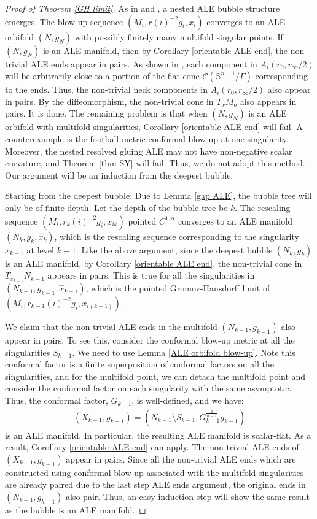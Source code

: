 \documentclass[12pt]{amsart}
\theoremstyle{definition}
\begin{document}
\begin{proof}[Proof of Theorem \ref{GH limit}]
    As in \cite{Bubble} and \cite{TV2}, a nested ALE bubble structure emerges. The blow-up sequence $(M_i, r(i)^{-2}g_i, x_i)$ converges to an ALE orbifold $(N,g_N)$ with possibly finitely many multifold singular points. If $(N,g_N)$ is an ALE manifold, then by Corollary \ref{orientable ALE end}, the non-trivial ALE ends appear in pairs. As shown in \cite{Bubble}, each component in $A_i(r_0, r_\infty/2)$ will be arbitrarily close to a portion of the flat cone $ \mathcal{C}(\mathbb{S}^{n-1}/\Gamma)$ corresponding to the ends. Thus, the non-trivial neck components in $A_i(r_0, r_\infty/2)$ also appear in pairs. By the diffeomorphism, the non-trivial cone in $T_xM_o$ also appears in pairs. It is done. The remaining problem is that when $(N,g_N)$ is an ALE orbifold with multifold singularities, Corollary \ref{orientable ALE end} will fail. A counterexample is the football metric conformal blow-up at one singularity. Moreover, the nested resolved gluing ALE may not have non-negative scalar curvature, and Theorem \ref{thm SY} will fail. Thus, we do not adopt this method. Our argument will be an induction from the deepest bubble.

    Starting from the deepest bubble: Due to Lemma \ref{gap ALE}, the bubble tree will only be of finite depth. Let the depth of the bubble tree be $k$. The rescaling sequence $(M_i, r_k(i)^{-2} g_i, x_{ik})$ pointed $C^{1,\alpha}$ converges to an ALE manifold $(N_k, g_k, \hat{x}_k)$, which is the rescaling sequence corresponding to the singularity $x_{k-1}$ at level $k-1$. Like the above argument, since the deepest bubble $(N_k, g_k)$ is an ALE manifold, by Corollary \ref{orientable ALE end}, the non-trivial cone in $T_{x_{k-1}} N_{k-1}$ appears in pairs. This is true for all the singularities in $(N_{k-1}, g_{k-1}, \hat{x}_{k-1})$, which is the pointed Gromov-Hausdorff limit of $(M_i, r_{k-1}(i)^{-2} g_i, x_{i(k-1)})$. 
    
    We claim that the non-trivial ALE ends in the multifold $(N_{k-1}, g_{k-1})$ also appear in pairs. To see this, consider the conformal blow-up metric at all the singularities $S_{k-1}$. We need to use Lemma \ref{ALE orbifold blow-up}. Note this conformal factor is a finite superposition of conformal factors on all the singularities, and for the multifold point, we can detach the multifold point and consider the conformal factor on each singularity with the same asymptotic. Thus, the conformal factor, $G_{k-1}$, is well-defined, and we have:
    \begin{align*}
        (X_{k-1}, g_{k-1})=(N_{k-1}\setminus S_{k-1}, G_{k-1}^{\frac{4}{n-2}}g_{k-1})
    \end{align*}
    is an ALE manifold. In particular, the resulting ALE manifold is scalar-flat. As a result, Corollary \ref{orientable ALE end} can apply. The non-trivial ALE ends of $(X_{k-1}, g_{k-1})$ appear in pairs. Since all the non-trivial ALE ends which are constructed using conformal blow-up associated with the multifold singularities are already paired due to the last step ALE ends argument, the original ends in $(N_{k-1}, g_{k-1})$ also pair. Thus, an easy induction step will show the same result as the bubble is an ALE manifold. 
\end{proof}
\end{document}
